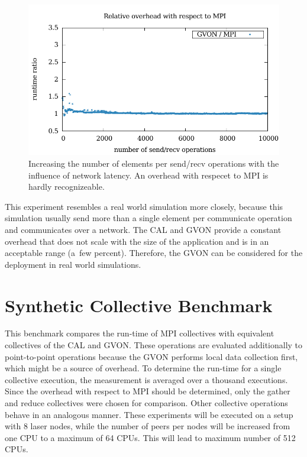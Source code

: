 \begin{figure}[H]
\begin{minipage}[t]{0.5\textwidth}
    \includegraphics[width=\textwidth]{plots/50_nsize_network_overhead_gvon_laser}
  \end{minipage}%
  \caption{Increasing the number of elements per send/recv operations
    with the influence of network latency. An overhead with respecet
    to MPI is hardly recognizeable.}
  \label{fig:nsend_network}
\end{figure}

\noindent This experiment resembles a real world simulation more
closely, because this simulation usually send more than a single
element per communicate operation and communicates over a network.
The CAL and GVON provide a constant overhead that does not scale with
the size of the application and is in an acceptable range (a~few
percent).  Therefore, the GVON can be considered for the deployment in
real world simulations.


\section{Synthetic Collective Benchmark}
This benchmark compares the run-time of MPI collectives with
equivalent collectives of the CAL and GVON. These operations are
evaluated additionally to point-to-point operations because the GVON
performs local data collection first, which might be a source of
overhead.  To determine the run-time for a single collective
execution, the measurement is averaged over a thousand executions.
Since the overhead with respect to MPI should be determined, only the
gather and reduce collectives were chosen for comparison. Other
collective operations behave in an analogous manner. These experiments
will be executed on a setup with 8 laser nodes, while the number of
peers per nodes will be increased from one CPU to a maximum of 64
CPUs.  This will lead to maximum number of 512 CPUs.

